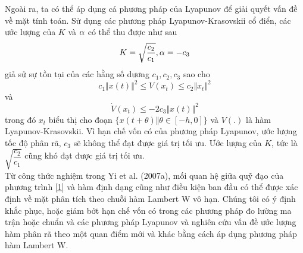 %
Ngoài ra, ta có thể áp dụng cá phương pháp của Lyapunov để giải
quyết vấn đề về mặt tính toán. Sử dụng các phương pháp Lyapunov-Krasovskii cổ điển, các ước lượng của $K$ và $\alpha$ có thể thu được như sau
%
\begin{equation}\label{5}
	K = \sqrt{\dfrac{c_2}{c_1}}, \alpha = - c_3
\end{equation}
%
giả sử sự tồn tại của các hằng số dương $c_1, c_2, c_3$ sao cho\\
%
\begin{equation}\label{6}
	c_1 \Vert x(t) \Vert ^2 \le V(x_t) \le c_2 \Vert x_t \Vert ^2
\end{equation}
%
và
%
\begin{equation}\label{7}
	\dot{V}(x_t) \le -2c_3 \Vert x(t) \Vert ^2
\end{equation}
%
trong đó $x_t$ biểu thị cho đoạn $\{x(t+ \theta) \Vert \theta \in [-h, 0]\}$ và $V(.)$ là hàm Lyapunov-Krasovskii. Vì hạn chế vốn có của phương pháp Lyapunov, ước lượng tốc độ phân rã, $c_3$ sẽ không thể đạt được giá trị tối ưu. Ước lượng của $K$, tức là $\sqrt{\dfrac{c_2}{c_1}}$ cũng khó đạt được giá trị tối ưu.\\
%
Từ công thức nghiệm trong Yi et al. (2007a), mối quan hệ giữa quỹ đạo của phương trình \eqref{1} và hàm định dạng cũng như điều kiện ban đầu có thể được xác định về mặt phân tích theo chuỗi hàm Lambert W vô hạn. 
Chúng tôi có ý định khắc phục, hoặc giảm bớt hạn chế vốn có trong các phương pháp đo lường ma trận hoặc chuẩn và các phương pháp Lyapunov và nghiên cứu vấn đề ước lượng hàm phân rã theo một quan điểm mới và khác bằng cách áp dụng phương pháp hàm Lambert W.

